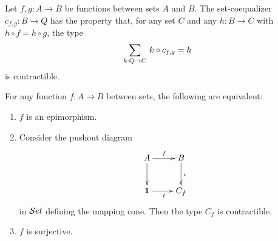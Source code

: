 \begin{lem}
Let $f,g:A\to B$ be functions between sets $A$ and $B$. The 
{set-co}equalizer $c_{f,g}:B\to Q$ has the property that, for any set $C$ and any $h:B\to C$ with $h\circ f = h\circ g$, the type
\begin{equation*}
\sm{k:Q\to C} k\circ c_{f,g} = h
\end{equation*}
is contractible.
\end{lem}

\begin{lem}\label{epis-surj}
For any function $f:A\to B$ between sets, the following are equivalent:
\begin{enumerate}
\item $f$ is an epimorphism.
\item Consider the pushout diagram
\begin{equation*}
  \xymatrix{
    {A}
    \ar[r]^{f}
    \ar[d]
    &
    {B}
    \ar[d]^{\iota}
    \\
    {\unit}
    \ar[r]_{t}
    &
    {C_f}
  }
\end{equation*}
in $\mathcal{S}et$ defining the mapping cone. Then the type $C_f$ is contractible.
\item $f$ is surjective.
\end{enumerate}
\end{lem}

